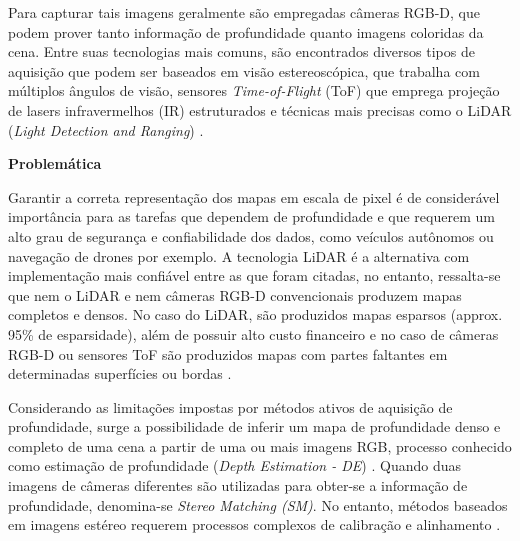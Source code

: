 Para capturar tais imagens geralmente são empregadas câmeras RGB-D, que podem prover tanto informação de profundidade quanto imagens coloridas da cena. Entre suas tecnologias mais comuns, são encontrados diversos tipos de aquisição que podem ser baseados em visão estereoscópica, que trabalha com múltiplos ângulos de visão, sensores \textit{Time-of-Flight} (ToF) que emprega projeção de lasers infravermelhos (IR) estruturados e técnicas mais precisas como o LiDAR (\textit{Light Detection and Ranging}) \cite{castellano2023performance}.






\textbf{Problemática} 

Garantir a correta representação dos mapas em escala de pixel é de considerável importância para as tarefas que dependem de profundidade e que requerem um alto grau de segurança e confiabilidade dos dados, como veículos autônomos ou navegação de drones por exemplo. A tecnologia LiDAR é a alternativa com implementação mais confiável entre as que foram citadas, no entanto, ressalta-se que nem o LiDAR e nem câmeras RGB-D convencionais produzem mapas completos e densos. No caso do LiDAR, são produzidos mapas esparsos (approx. 95\% de esparsidade), além de possuir alto custo financeiro e no caso de câmeras RGB-D ou sensores ToF são produzidos mapas com partes faltantes em determinadas superfícies ou bordas \cite{hu2012robust}. 







Considerando as limitações impostas por métodos ativos de aquisição de profundidade, surge a possibilidade de inferir um mapa de profundidade denso e completo de uma cena a partir de uma ou mais imagens RGB, processo conhecido como estimação de profundidade (\textit{Depth Estimation - DE}) \cite{rajapaksha2024deep}. Quando duas imagens de câmeras diferentes são utilizadas para obter-se a informação de profundidade, denomina-se \textit{Stereo Matching (SM)}. No entanto, métodos baseados em imagens estéreo requerem processos complexos de calibração e alinhamento \cite{dong2022towards}.



